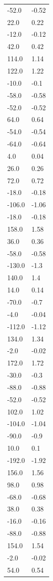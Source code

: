 \begin{longtable}{ll}
-52.0 & -0.52 \\
22.0 & 0.22 \\
-12.0 & -0.12 \\
42.0 & 0.42 \\
114.0 & 1.14 \\
122.0 & 1.22 \\
-10.0 & -0.1 \\
-58.0 & -0.58 \\
-52.0 & -0.52 \\
64.0 & 0.64 \\
-54.0 & -0.54 \\
-64.0 & -0.64 \\
4.0 & 0.04 \\
26.0 & 0.26 \\
72.0 & 0.72 \\
-18.0 & -0.18 \\
-106.0 & -1.06 \\
-18.0 & -0.18 \\
158.0 & 1.58 \\
36.0 & 0.36 \\
-58.0 & -0.58 \\
-130.0 & -1.3 \\
140.0 & 1.4 \\
14.0 & 0.14 \\
-70.0 & -0.7 \\
-4.0 & -0.04 \\
-112.0 & -1.12 \\
134.0 & 1.34 \\
-2.0 & -0.02 \\
172.0 & 1.72 \\
-30.0 & -0.3 \\
-88.0 & -0.88 \\
-52.0 & -0.52 \\
102.0 & 1.02 \\
-104.0 & -1.04 \\
-90.0 & -0.9 \\
10.0 & 0.1 \\
-192.0 & -1.92 \\
156.0 & 1.56 \\
98.0 & 0.98 \\
-68.0 & -0.68 \\
38.0 & 0.38 \\
-16.0 & -0.16 \\
-88.0 & -0.88 \\
154.0 & 1.54 \\
-2.0 & -0.02 \\
54.0 & 0.54 \\

\end{longtable}
